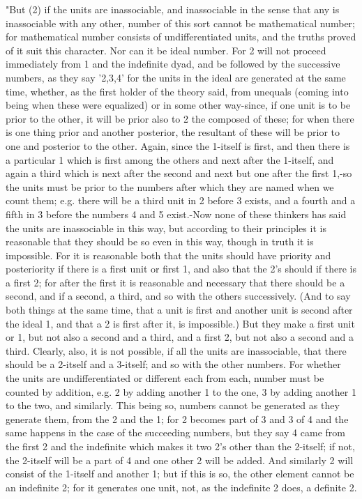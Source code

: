 "But (2) if the units are inassociable, and inassociable in the sense
that any is inassociable with any other, number of this sort cannot
be mathematical number; for mathematical number consists of undifferentiated
units, and the truths proved of it suit this character. Nor can it
be ideal number. For 2 will not proceed immediately from 1 and the
indefinite dyad, and be followed by the successive numbers, as they
say '2,3,4' for the units in the ideal are generated at the same time,
whether, as the first holder of the theory said, from unequals (coming
into being when these were equalized) or in some other way-since,
if one unit is to be prior to the other, it will be prior also to
2 the composed of these; for when there is one thing prior and another
posterior, the resultant of these will be prior to one and posterior
to the other. Again, since the 1-itself is first, and then there is
a particular 1 which is first among the others and next after the
1-itself, and again a third which is next after the second and next
but one after the first 1,-so the units must be prior to the numbers
after which they are named when we count them; e.g. there will be
a third unit in 2 before 3 exists, and a fourth and a fifth in 3 before
the numbers 4 and 5 exist.-Now none of these thinkers has said the
units are inassociable in this way, but according to their principles
it is reasonable that they should be so even in this way, though in
truth it is impossible. For it is reasonable both that the units should
have priority and posteriority if there is a first unit or first 1,
and also that the 2's should if there is a first 2; for after the
first it is reasonable and necessary that there should be a second,
and if a second, a third, and so with the others successively. (And
to say both things at the same time, that a unit is first and another
unit is second after the ideal 1, and that a 2 is first after it,
is impossible.) But they make a first unit or 1, but not also a second
and a third, and a first 2, but not also a second and a third. Clearly,
also, it is not possible, if all the units are inassociable, that
there should be a 2-itself and a 3-itself; and so with the other numbers.
For whether the units are undifferentiated or different each from
each, number must be counted by addition, e.g. 2 by adding another
1 to the one, 3 by adding another 1 to the two, and similarly. This
being so, numbers cannot be generated as they generate them, from
the 2 and the 1; for 2 becomes part of 3 and 3 of 4 and the same happens
in the case of the succeeding numbers, but they say 4 came from the
first 2 and the indefinite which makes it two 2's other than the 2-itself;
if not, the 2-itself will be a part of 4 and one other 2 will be added.
And similarly 2 will consist of the 1-itself and another 1; but if
this is so, the other element cannot be an indefinite 2; for it generates
one unit, not, as the indefinite 2 does, a definite 2. 

